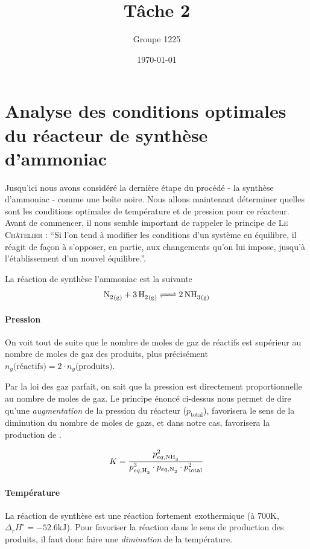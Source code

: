 \documentclass[a4paper, oneside, 12pt]{article}
\title{Tâche 2}
\author{Groupe 1225}
\date{\today}
\begin{document}
\maketitle

\section{Analyse des conditions optimales du réacteur de synthèse d'ammoniac}

Jusqu'ici nous avons considéré la dernière étape du procédé - la synthèse d'ammoniac -
comme une bo\^ite noire. Nous allons maintenant déterminer quelles sont les conditions 
optimales de température et de pression pour ce réacteur. 
Avant de commencer, il nous semble important de rappeler le principe 
de \textsc{Le Ch\^atelier} : \enquote{Si l'on tend à modifier les conditions d'un système en équilibre, 
il réagit de façon à s'opposer, en partie, aux changements qu'on lui impose, 
jusqu'à l'établissement d'un nouvel équilibre.}. \cite{chatelier}

La réaction de synthèse l'ammoniac est la suivante
\[\ce{N2_{(g)} + 3H2_{(g)} <=> 2NH3_{(g)} } \]

\paragraph{Pression}

On voit tout de suite que le nombre de moles de gaz de réactifs est supérieur 
au nombre de moles de gaz des produits, 
plus précisément $n_{g}\text{(réactifs)} = 2 \cdot n_{g}\text{(produits)}$.

Par la loi des gaz parfait, on sait que la pression est directement proportionnelle 
au nombre de moles de gaz. Le principe énoncé ci-dessus
nous permet de dire qu'une \emph{augmentation} de la pression du réacteur ($p_{\text{total}}$),
favorisera le sens de la diminution du nombre de moles de gazs, 
et dans notre cas, favorisera la production de .

\[
K = \frac{p_{eq,\ce{NH3}}^2}{p_{eq,\ce{H2}}^3 \cdot p_{eq,\ce{N2}} \cdot p_{\text{total}}^2}
\]
\paragraph{Température}

La réaction de synthèse est une réaction fortement exothermique 
(à $700\si{\kelvin}$, $\Delta_r H^{\circ} = -52.6\si{\kilo\joule}$).
Pour favoriser la réaction dans le sens de production des produits,
il faut donc faire une \emph{diminution} de la température.
\end{document}
